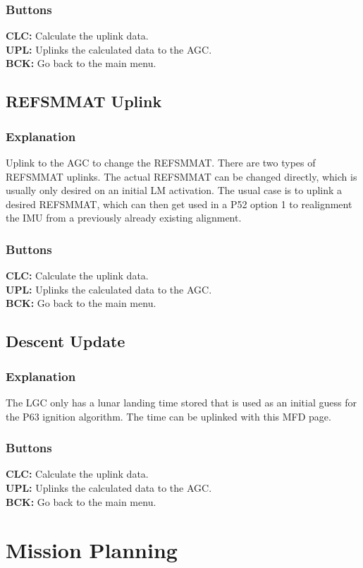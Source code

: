 \documentclass[11pt]{article} %
\begin{document}
\subsubsection{Buttons}
\textbf{CLC:} Calculate the uplink data.\\
\textbf{UPL:} Uplinks the calculated data to the AGC.\\
\textbf{BCK:} Go back to the main menu.\\
\subsection{REFSMMAT Uplink}
\subsubsection{Explanation}
Uplink to the AGC to change the REFSMMAT. There are two types of REFSMMAT uplinks. The actual REFSMMAT can be changed directly, which is usually only desired on an initial LM activation. The usual case is to uplink a desired REFSMMAT, which can then get used in a P52 option 1 to realignment the IMU from a previously already existing alignment.
\subsubsection{Buttons}
\textbf{CLC:} Calculate the uplink data.\\
\textbf{UPL:} Uplinks the calculated data to the AGC.\\
\textbf{BCK:} Go back to the main menu.\\
\subsection{Descent Update}
\subsubsection{Explanation}
The LGC only has a lunar landing time stored that is used as an initial guess for the P63 ignition algorithm. The time can be uplinked with this MFD page.
\subsubsection{Buttons}
\textbf{CLC:} Calculate the uplink data.\\
\textbf{UPL:} Uplinks the calculated data to the AGC.\\
\textbf{BCK:} Go back to the main menu.\\
\newpage
\section{Mission Planning}
\end{document}
